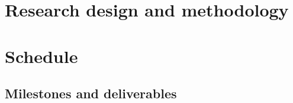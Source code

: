 \documentclass[journal,onecolumn]{IEEEtran}
\begin{document}
\section{Research design and methodology} %


\section{Schedule} %
\subsection{Milestones and deliverables}
\renewcommand{\theenumi}{M.\arabic{enumi}}
\renewcommand{\theenumii}{d.\arabic{enumi}.\arabic{enumii}}
\end{document}

